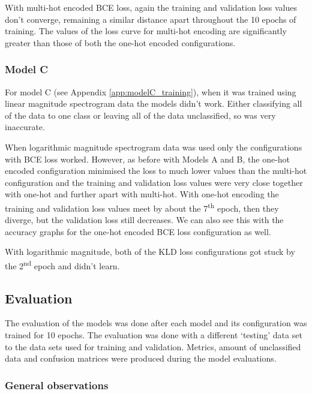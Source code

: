 \documentclass[12pt]{article}
\begin{document}
	With multi-hot encoded BCE loss, again the training and validation loss values don't converge, remaining a similar distance apart throughout the 10 epochs of training. The values of the loss curve for multi-hot encoding are significantly greater than those of both the one-hot encoded configurations.
	
	\subsubsection{Model C}
	\label{sec:training_analysis_modelC}
	
	For model C (see Appendix \ref{app:modelC_training}), when it was trained using linear magnitude spectrogram data the models didn't work. Either classifying all of the data to one class or leaving all of the data unclassified, so was very inaccurate.\medskip
	
	When logarithmic magnitude spectrogram data was used only the configurations with BCE loss worked. However, as before with Models A and B, the one-hot encoded configuration minimised the loss to much lower values than the multi-hot configuration and the training and validation loss values were very close together with one-hot and further apart with multi-hot. With one-hot encoding the training and validation loss values meet by about the 7\textsuperscript{th} epoch, then they diverge, but the validation loss still decreases. We can also see this with the accuracy graphs for the one-hot encoded BCE loss configuration as well.
	
	With logarithmic magnitude, both of the KLD loss configurations got stuck by the 2\textsuperscript{nd} epoch and didn't learn.
	
	\subsection{Evaluation}
	\label{sec:evaluation_analysis}
    The evaluation of the models was done after each model and its configuration was trained for 10 epochs. The evaluation was done with a different `testing' data set to the data sets used for training and validation. Metrics, amount of unclassified data and confusion matrices were produced during the model evaluations.
    
    \subsubsection{General observations}
    \label{sec:evaluation_general}
    
\end{document}

